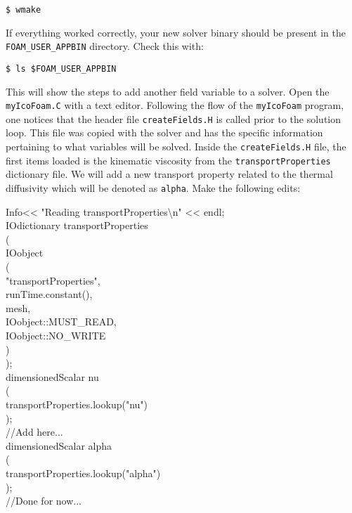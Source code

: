 \documentclass{article}
\newcommand\tab[1][0.5cm]{\hspace*{#1}}
\begin{document}
\begin{enumerate}
	{\tt \tab \$ wmake}
	
	If everything worked correctly, your new solver binary should be present in the {\tt FOAM\_USER\_APPBIN} directory. Check this with:
	
	{\tt \tab \$ ls \$FOAM\_USER\_APPBIN }
	
	\vspace{0.2cm}
	
	This will show the steps to add another field variable to a solver. Open the {\tt myIcoFoam.C} with a text editor. Following the flow of the {\tt myIcoFoam} program, one notices that the header file {\tt createFields.H} is called prior to the solution loop. This file was copied with the solver and has the specific information pertaining to what variables will be solved. Inside the {\tt createFields.H} file, the first items loaded is the kinematic viscosity from the {\tt transportProperties} dictionary file. We will add a new transport property related to the thermal diffusivity which will be denoted as {\tt alpha}. Make the following edits: 
	

	\begin{myframe}
	{\tt %
 
		Info<< "Reading transportProperties\textbackslash n" << endl;
		\\
		
		IOdictionary transportProperties \\
		(\\
		\tab IOobject \\
		\tab ( \\
		\tab \tab "transportProperties",\\
		\tab \tab runTime.constant(), \\
		\tab \tab mesh,\\
		\tab \tab IOobject::MUST\_READ,\\
		\tab \tab IOobject::NO\_WRITE\\
		\tab )\\
		 );
		\\
		
		dimensionedScalar nu \\
		( \\
		\tab transportProperties.lookup("nu") \\
		);\\
		//Add here... \\
		dimensionedScalar alpha \\
		(\\
		\tab transportProperties.lookup("alpha")\\
		);\\
		//Done for now... \\

}
\end{myframe}
\end{enumerate}
\end{document}
